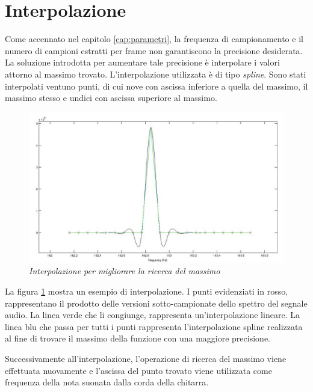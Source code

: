 \section{Interpolazione}\label{cap:interpolazione}

Come accennato nel capitolo \ref{cap:parametri}, la frequenza di campionamento e il numero di campioni estratti per frame non garantiscono la precisione desiderata.
La soluzione introdotta per aumentare tale precisione è interpolare i valori attorno al massimo trovato.
L'interpolazione utilizzata è di tipo \emph{spline}.
Sono stati interpolati ventuno punti, di cui nove con ascissa inferiore a quella del massimo, il massimo stesso e undici con ascissa superiore al massimo.

	\begin{figure}[h]
	  \begin{center} 
	    \includegraphics[width=\textwidth*\real{0.9}]{images/ch_05/interpolazione.jpg}
	  \end{center} 
	  \caption{\textit{Interpolazione per migliorare la ricerca del massimo}}  
	  \label{fig:interpolazione}
	\end{figure}

La figura \ref{fig:interpolazione} mostra un esempio di interpolazione. 
I punti evidenziati in rosso, rappresentano il prodotto delle versioni sotto-campionate dello spettro del segnale audio.
La linea verde che li congiunge, rappresenta un'interpolazione lineare.
La linea blu che passa per tutti i punti rappresenta l'interpolazione spline realizzata al fine di trovare il massimo della funzione con una maggiore precisione.

Successivamente all'interpolazione, l'operazione di ricerca del massimo viene effettuata nuovamente e l'ascissa del punto trovato viene utilizzata come frequenza della nota suonata dalla corda della chitarra.


